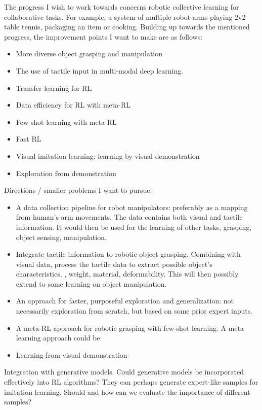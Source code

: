 The progress I wish to work towards concerns robotic collective learning for collaborative tasks. For example, a system of multiple robot arms playing 2v2 table tennis, packaging an item or cooking. Building up towards the mentioned progress, the improvement points I want to make are as follows:

\begin{itemize}
	\item More diverse object grasping and manipulation
	\item The use of tactile input in multi-modal deep learning.
	\item Transfer learning for \ac{RL}
	\item Data efficiency for \ac{RL} with meta-\ac{RL}
	\item Few shot learning with meta RL
	\item Fast RL
	\item Visual imitation learning: learning by visual demonstration \cite{handa2020dexpilot}
	\item Exploration from demonstration
\end{itemize}

Directions / smaller problems I want to pursue:

\begin{itemize}
	\item A data collection pipeline for robot manipulators: preferably as a mapping from human’s arm movements. The data contains both visual and tactile information. It would then be used for the learning of other tasks, \eg grasping, object sensing, manipulation.
	\item Integrate tactile information to robotic object grasping. Combining with visual data, process the tactile data to extract possible object's characteristics, \eg, weight, material, deformability.
	This will then possibly extend to some learning on object manipulation.
	\item An approach for faster, purposeful exploration and generalization: not necessarily exploration from scratch, but based on some prior expert inputs.
	\item A meta-\ac{RL} approach for robotic grasping with few-shot learning. A meta learning approach could be 
	\item Learning from visual demonstration \todo{}
\end{itemize}
Integration with generative models. Could generative models be incorporated effectively into RL algorithms? They can perhaps generate expert-like samples for imitation learning. Should and how can we evaluate the importance of different samples?

